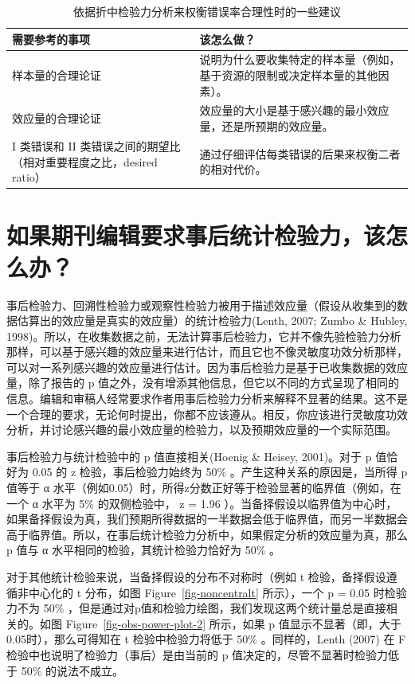 \documentclass[
  letterpaper,
  DIV=11,
  numbers=noendperiod]{scrreprt}
\begin{document}
\hypertarget{tbl-table-compromise-just}{}
\begin{table}
\caption{\label{tbl-table-compromise-just}依据折中检验力分析来权衡错误率合理性时的一些建议 }\tabularnewline

\centering
\begin{tabular}{>{\raggedright\arraybackslash}p{5cm}|>{\raggedright\arraybackslash}p{10cm}}
\hline
需要参考的事项 & 该怎么做？\\
\hline
样本量的合理论证 & 说明为什么要收集特定的样本量（例如，基于资源的限制或决定样本量的其他因素）。\\
\hline
效应量的合理论证 & 效应量的大小是基于感兴趣的最小效应量，还是所预期的效应量。\\
\hline
I 类错误和 II 类错误之间的期望比（相对重要程度之比，desired ratio） & 通过仔细评估每类错误的后果来权衡二者的相对代价。\\
\hline
\end{tabular}
\end{table}

\hypertarget{sec-posthocpower}{%
\section{如果期刊编辑要求事后统计检验力，该怎么办？}\label{sec-posthocpower}}

事后检验力、回溯性检验力或观察性检验力被用于描述效应量（假设从收集到的数据估算出的效应量是真实的效应量）的统计检验力(Lenth,
2007; Zumbo \& Hubley,
1998)。所以，在收集数据之前，无法计算事后检验力，它并不像先验检验力分析那样，可以基于感兴趣的效应量来进行估计，而且它也不像灵敏度功效分析那样，可以对一系列感兴趣的效应量进行估计。因为事后检验力是基于已收集数据的效应量，除了报告的
p
值之外，没有增添其他信息，但它以不同的方式呈现了相同的信息。编辑和审稿人经常要求作者用事后检验力分析来解释不显著的结果。这不是一个合理的要求，无论何时提出，你都不应该遵从。相反，你应该进行灵敏度功效分析，并讨论感兴趣的最小效应量的检验力，以及预期效应量的一个实际范围。

事后检验力与统计检验中的 p 值直接相关(Hoenig \& Heisey, 2001)。对于 p
值恰好为 0.05 的 z 检验，事后检验力始终为 50\%
。产生这种关系的原因是，当所得 p 值等于 α
水平（例如0.05）时，所得z分数正好等于检验显著的临界值（例如，在一个 α
水平为 5\% 的双侧检验中， z = 1.96
）。当备择假设以临界值为中心时，如果备择假设为真，我们预期所得数据的一半数据会低于临界值，而另一半数据会高于临界值。所以，在事后统计检验力分析中，如果假定分析的效应量为真，那么
p 值与 α 水平相同的检验，其统计检验力恰好为 50\% 。

对于其他统计检验来说，当备择假设的分布不对称时（例如 t
检验，备择假设遵循非中心化的 t 分布，如图 Figure~\ref{fig-noncentralt}
所示），一个 p = 0.05 时检验力不为 50\%
，但是通过对p值和检验力绘图，我们发现这两个统计量总是直接相关的。如图
Figure~\ref{fig-obs-power-plot-2} 所示，如果 p
值显示不显著（即，大于0.05时），那么可得知在 t 检验中检验力将低于 50\%
。同样的，Lenth (2007) 在 F 检验中也说明了检验力（事后）是由当前的 p
值决定的，尽管不显著时检验力低于 50\% 的说法不成立。
\end{document}

